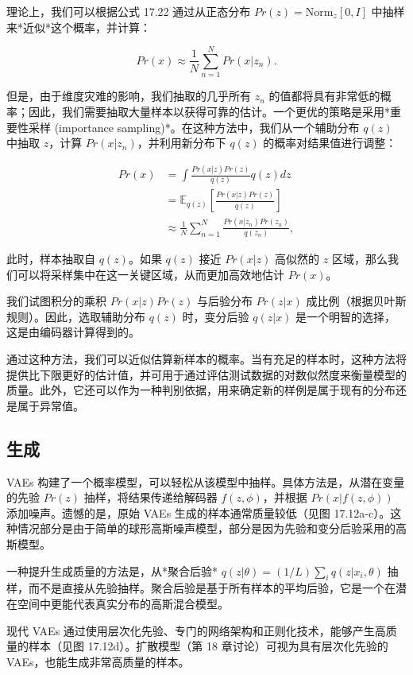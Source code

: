 理论上，我们可以根据公式 17.22 通过从正态分布 \(Pr(z) = \text{Norm}_z[0,I]\) 中抽样来*近似*这个概率，并计算：

\begin{equation}
Pr(x) \approx \frac{1}{N} \sum_{n=1}^{N} Pr(x|z_n). 
\end{equation}

但是，由于维度灾难的影响，我们抽取的几乎所有 \(z_n\) 的值都将具有非常低的概率；因此，我们需要抽取大量样本以获得可靠的估计。一个更优的策略是采用*重要性采样 (importance sampling)*。在这种方法中，我们从一个辅助分布 \(q(z)\) 中抽取 \(z\)，计算 \(Pr(x|z_n)\)，并利用新分布下 \(q(z)\) 的概率对结果值进行调整：


\begin{align}
Pr(x) &= \int \frac{Pr(x|z)Pr(z)}{q(z)}q(z)dz \\
&= \mathbb{E}_{q(z)} \left[\frac{Pr(x|z)Pr(z)}{q(z)}\right] \\
&\approx \frac{1}{N} \sum_{n=1}^{N} \frac{Pr(x|z_n)Pr(z_n)}{q(z_n)}, 
\end{align} 


此时，样本抽取自 \(q(z)\)。如果 \(q(z)\) 接近 \(Pr(x|z)\) 高似然的 \(z\) 区域，那么我们可以将采样集中在这一关键区域，从而更加高效地估计 \(Pr(x)\)。

我们试图积分的乘积 \(Pr(x|z)Pr(z)\) 与后验分布 \(Pr(z|x)\) 成比例（根据贝叶斯规则）。因此，选取辅助分布 \(q(z)\) 时，变分后验 \(q(z|x)\) 是一个明智的选择，这是由编码器计算得到的。

通过这种方法，我们可以近似估算新样本的概率。当有充足的样本时，这种方法将提供比下限更好的估计值，并可用于通过评估测试数据的对数似然度来衡量模型的质量。此外，它还可以作为一种判别依据，用来确定新的样例是属于现有的分布还是属于异常值。

\subsection{生成}
VAEs 构建了一个概率模型，可以轻松从该模型中抽样。具体方法是，从潜在变量的先验 \(Pr(z)\) 抽样，将结果传递给解码器 \(f(z, \phi)\)，并根据 \(Pr(x|f(z, \phi))\) 添加噪声。遗憾的是，原始 VAEs 生成的样本通常质量较低（见图 17.12a-c）。这种情况部分是由于简单的球形高斯噪声模型，部分是因为先验和变分后验采用的高斯模型。

一种提升生成质量的方法是，从*聚合后验* \(q(z|\theta) = (1/L) \sum_{i} q(z|x_i, \theta)\) 抽样，而不是直接从先验抽样。聚合后验是基于所有样本的平均后验，它是一个在潜在空间中更能代表真实分布的高斯混合模型。

现代 VAEs 通过使用层次化先验、专门的网络架构和正则化技术，能够产生高质量的样本（见图 17.12d）。扩散模型（第 18 章讨论）可视为具有层次化先验的 VAEs，也能生成非常高质量的样本。

